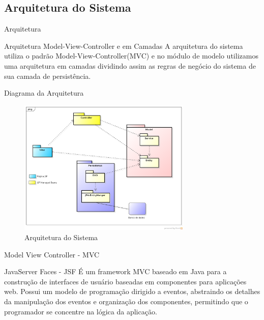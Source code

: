 \documentclass[xcolor=dvipsnames]{beamer}
\begin{document}


	\subsection{Arquitetura do Sistema}
	 \begin{frame}{Arquitetura}		
		\begin{block}{Arquitetura Model-View-Controller e em Camadas}
A arquitetura do sistema utiliza o padrão Model-View-Controller(MVC) e no módulo de modelo utilizamos uma arquitetura em camadas dividindo assim as regras de negócio do sistema de sua camada de persistência.  
		\end{block}	
	\end{frame}



	
	\begin{frame}{Diagrama da Arquitetura}
		\begin{figure}[!htb]
			\centering
			\includegraphics[keepaspectratio=true,height=6.5cm]{ArquiteturaRecomendador.png}
			\caption{Arquitetura do Sistema}
			\label{ArquiteturaSistema}
		\end{figure}				
	\end{frame}
	


	\begin{frame}{Model View Controller - MVC}
		\begin{block}{JavaServer Faces - JSF}	
É um framework MVC baseado em Java para a construção de interfaces de usuário baseadas em componentes para aplicações web. Possui um modelo de programação dirigido a eventos, abstraindo os detalhes da manipulação dos eventos e organização dos componentes, permitindo que o programador se concentre na lógica da aplicação.	
		\end{block}
	\end{frame}
\end{document}
